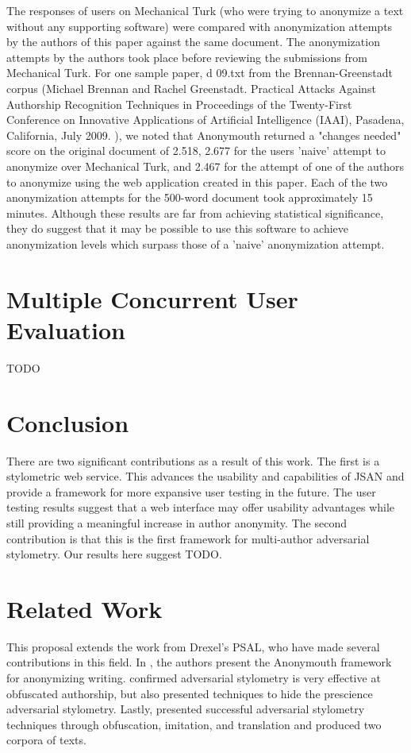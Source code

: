 \documentclass[letterpaper]{article}
\begin{document}
The responses of users on Mechanical Turk (who were trying to
anonymize a text without any supporting software) were compared with
anonymization attempts by the authors of this paper against the same
document. The anonymization attempts by the authors took place before
reviewing the submissions from Mechanical Turk. For one sample paper,
d 09.txt from the Brennan-Greenstadt corpus (Michael Brennan and Rachel Greenstadt. Practical Attacks Against Authorship Recognition Techniques in Proceedings of the Twenty-First Conference on Innovative Applications of Artificial Intelligence (IAAI), Pasadena, California, July 2009.
), we noted that Anonymouth returned a "changes needed" score
on the original document of 2.518, 2.677 for the users 'naive' attempt
to anonymize over Mechanical Turk, and 2.467 for the attempt of one of
the authors to anonymize using the web application created in this
paper. Each of the two anonymization attempts for the 500-word
document took approximately 15 minutes. Although these results are far from achieving statistical
significance, they do suggest that it may be possible to use this
software to achieve anonymization levels which surpass those of a
'naive' anonymization attempt.

\section{Multiple Concurrent User Evaluation}

TODO

\section{Conclusion}

There are two significant contributions as a result of this work.  The
first is a stylometric web service.  This advances the usability
and capabilities of JSAN and provide a framework for more expansive
user testing in the future. The user testing results suggest that a
web interface may offer usability advantages while still providing a
meaningful increase in author anonymity.  The second contribution is that this is
the first framework for multi-author adversarial stylometry.  Our
results here suggest TODO.

\section*{Related Work}\label{sec:related}
This proposal extends the work from Drexel's PSAL, who have made
several contributions in this field.  In
\cite{conf/pet/McDonaldACSG12}, the authors present the Anonymouth
framework for anonymizing writing.
\cite{Afroz:2012:DHF:2310656.2310711} confirmed adversarial stylometry
is very effective at obfuscated authorship, but also presented
techniques to hide the prescience adversarial stylometry.  Lastly,
\cite{journals/tissec/BrennanAG12} presented successful adversarial
stylometry techniques through obfuscation, imitation, and translation
and produced two corpora of texts.
\end{document}

